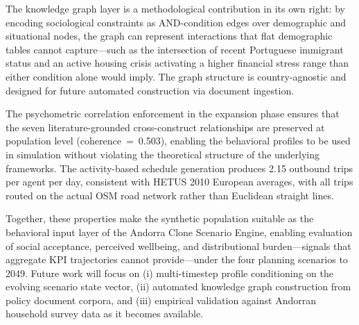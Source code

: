 \documentclass[sustainability,article,submit,pdftex,moreauthors]{Definitions/mdpi}
\begin{document}
The knowledge graph layer is a methodological contribution in its own right:
by encoding sociological constraints as AND-condition edges over demographic
and situational nodes, the graph can represent interactions that flat
demographic tables cannot capture---such as the intersection of recent
Portuguese immigrant status and an active housing crisis activating a
higher financial stress range than either condition alone would imply.
The graph structure is country-agnostic and designed for future automated
construction via document ingestion.

The psychometric correlation enforcement in the expansion phase ensures
that the seven literature-grounded cross-construct relationships are
preserved at population level (coherence~=~0.503), enabling the behavioral
profiles to be used in simulation without violating the theoretical
structure of the underlying frameworks. The activity-based schedule
generation produces 2.15 outbound trips per agent per day, consistent
with HETUS 2010 European averages, with all trips routed on the actual
OSM road network rather than Euclidean straight lines.

Together, these properties make the synthetic population suitable as the
behavioral input layer of the Andorra Clone Scenario Engine, enabling
evaluation of social acceptance, perceived wellbeing, and distributional
burden---signals that aggregate KPI trajectories cannot provide---under
the four planning scenarios to 2049. Future work will focus on
(i) multi-timestep profile conditioning on the evolving scenario state
vector, (ii) automated knowledge graph construction from policy document
corpora, and (iii) empirical validation against Andorran household survey
data as it becomes available.

\vspace{6pt}


\end{document}
